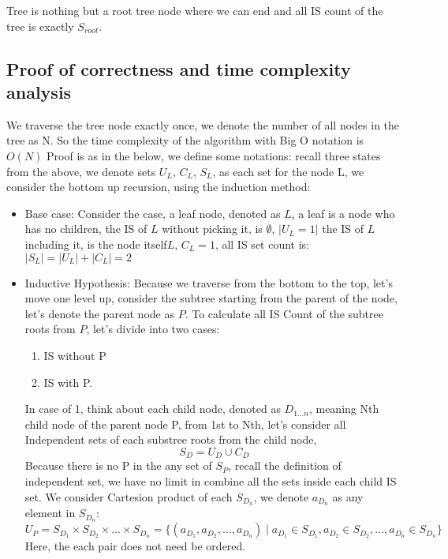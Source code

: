 \documentclass{article}
\begin{document}
Tree is nothing but a root tree node where we can end and all IS count of the tree is exactly $S_{root}$.

\subsection*{Proof of correctness and time complexity analysis}
We traverse the tree node exactly once, we denote the number of all nodes in the tree as N. So the time complexity of the algorithm with Big O notation is $O(N)$ \newline
Proof is as in the below, we define some notations: recall three states from the above, we denote sets $U_{L}$, $C_{L}$, $S_{L}$, as each set for the node L, we consider the bottom up recursion, using the induction method:
\begin{itemize}
  \item Base case: Consider the case, a leaf node, denoted as $L$, a leaf is a node who has no children, the IS of $L$ without picking it, is $\emptyset$, $|U_{L}=1|$  the IS of $L$ including it, is the node itself${L}$, $C_{L}=1$, all IS set count is: $|S_{L}| = |U_{L}| + |C_{L}| = 2$ 
  \item Inductive Hypothesis: Because we traverse from the bottom to the top, let's move one level up, consider the subtree starting from the parent of the node, let's denote the parent node as $P$. To calculate all IS Count of the subtree roots from $P$, let's divide into two cases: 
    \begin{enumerate}
      \item IS without P
      \item IS with P. 
    \end{enumerate}

    In case of 1, think about each child node, denoted as $D_{1...n}$, meaning Nth child node of the parent node P, from 1st to Nth,
    let's consider all Independent sets of each substree roots from the child node, 
    \[ S_{D} =  U_{D} \cup C_{D} \tag{$*$} \] 
    Because there is no P in the any set of $S_{P}$, recall the definition of independent set, we have no limit in combine all the sets inside each child IS set.
    We consider Cartesion product of each $S_{D_n}$, we denote $a_{D_n}$ as any element in $S_{D_n}$:
    \[ U_P =  S_{D_1} \times S_{D_2} \times \ldots \times S_{D_n} = \{(a_{D_1}, a_{D_2}, \ldots, a_{D_n}) \mid a_{D_1} \in S_{D_1}, a_{D_2} \in S_{D_2}, \ldots, a_{D_n} \in S_{D_n}\} \]
    Here, the each pair does not need be ordered.


\end{itemize}
\end{document}

